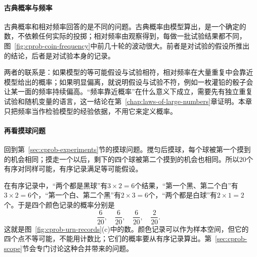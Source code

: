 \paragraph{古典概率与频率}
古典概率和相对频率回答的是不同的问题。古典概率由模型算出，是一个确定的数，不依赖任何实际的投掷；相对频率由观察得到，每做一批试验结果都不同，图~\ref{fig:cprob-coin-frequency}中前几十轮的波动很大。前者是对试验的假设所推出的结论，后者是对试验本身的记录。

两者的联系是：如果模型的等可能假设与试验相符，相对频率在大量重复中会靠近模型给出的概率；如果明显偏离，就说明假设与试验不符，例如一枚灌铅的骰子会让某一面的频率持续偏高。“频率靠近概率”在什么意义下成立，需要先有独立重复试验和随机变量的语言，这一结论在第~\ref{chap:laws-of-large-numbers}章证明。本章只把频率当作检验模型的经验依据，不用它来定义概率。

\paragraph{再看摸球问题}
回到第~\ref{sec:cprob-experiments}节的摸球问题。搅匀后摸球，每个球被第一个摸到的机会相同；摸走一个以后，剩下的四个球被第二个摸到的机会也相同。所以$20$个有序对同样可能，有序记录满足等可能假设。

在有序记录中，“两个都是黑球”有$3\times2=6$个结果，“第一个黑、第二个白”有$3\times2=6$个，“第一个白、第二个黑”有$2\times3=6$个，“两个都是白球”有$2\times1=2$个。于是四个颜色记录的概率分别是
\[
 \frac{6}{20},\quad \frac{6}{20},\quad \frac{6}{20},\quad \frac{2}{20}.
\]
这就是图~\ref{fig:cprob-urn-records}(c)中的数。颜色记录可以作为样本空间，但它的四个点不等可能，不能用计数比；它们的概率要从有序记录算出。第~\ref{sec:cprob-scope}节会专门讨论这种合并带来的问题。

